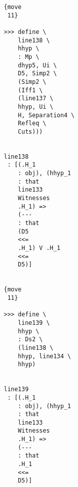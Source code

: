 \documentclass[12pt]{article}
\begin{document}
\begin{verbatim}
                                    {move 
                                     11}

                                    >>> define \
                                        line138 \
                                        hhyp \
                                        : Mp \
                                        dhyp5, Ui \
                                        D5, Simp2 \
                                        (Simp2 \
                                        (Iff1 \
                                        (line137 \
                                        hhyp, Ui \
                                        H, Separation4 \
                                        Refleq \
                                        Cuts)))


                                    line138 
                                     : [(.H_1 
                                        : obj), (hhyp_1 
                                        : that 
                                        line133 
                                        Witnesses 
                                        .H_1) => 
                                        (--- 
                                        : that 
                                        (D5 
                                        <<= 
                                        .H_1) V .H_1 
                                        <<= 
                                        D5)]


                                    {move 
                                     11}

                                    >>> define \
                                        line139 \
                                        hhyp \
                                        : Ds2 \
                                        (line138 \
                                        hhyp, line134 \
                                        hhyp)


                                    line139 
                                     : [(.H_1 
                                        : obj), (hhyp_1 
                                        : that 
                                        line133 
                                        Witnesses 
                                        .H_1) => 
                                        (--- 
                                        : that 
                                        .H_1 
                                        <<= 
                                        D5)]



\end{verbatim}
\end{document}
